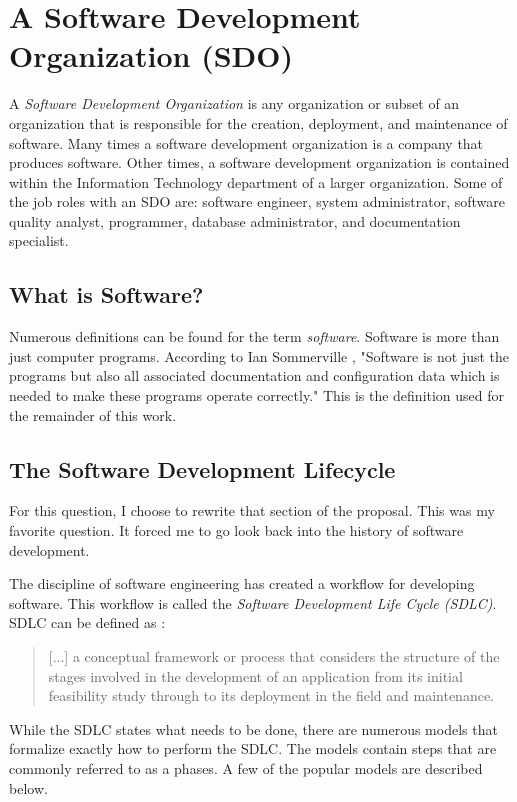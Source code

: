\documentclass[SDSUThesis.tex]{subfiles}
\begin{document}
\section{A Software Development Organization (SDO)}
A \textit{Software Development Organization} is any organization or subset of an organization that is responsible
for the creation, deployment, and maintenance of software.  Many times a software development organization
is a company that produces software.  Other times, a software development organization is contained
within the Information Technology department of a larger organization. Some of the job roles
with an SDO are: software engineer, system administrator, software quality analyst,
programmer, database administrator, and documentation specialist.


\subsection{What is Software?}
Numerous definitions can be found for the term \textit{software}.
Software is more than just computer programs. According to Ian Sommerville \cite{Sommerville2001}, 
"Software is not just the programs but also all associated documentation and configuration data which is needed to make these programs operate correctly."
This is the definition used for the remainder of this work.


\subsection{The Software Development Lifecycle}
    For this question, I choose to rewrite that section of the proposal.  This was
    my favorite question. It forced me to go look back into the history of
    software development. 
    
    The discipline of software engineering has created a workflow for developing
    software.  
    This workflow is called the \textit{Software Development Life Cycle (SDLC)}.
    SDLC can be defined as \cite{Ruparelia2010}:
    \begin{quote}
     [...] a conceptual framework or process that considers the structure of the stages
     involved in the development of an application from its initial feasibility study
     through to its deployment in the field and maintenance.
    \end{quote}
    While the SDLC states what needs to be done, there are numerous models 
    that formalize exactly how to perform the SDLC.  The models contain
    steps that are commonly referred to as a phases. A few of the popular
    models are described below.
    
\end{document}
